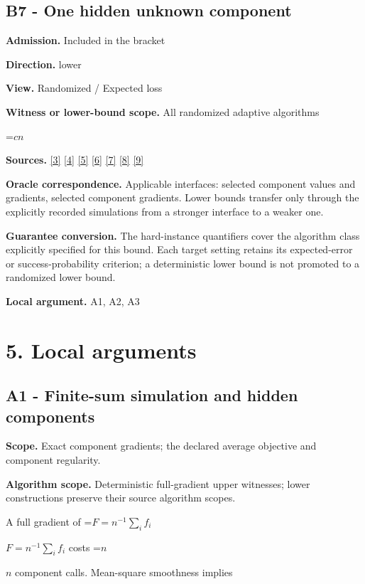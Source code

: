 \documentclass[10pt,a4paper]{article}
\newcommand{\AtlasMath}[1]{\par\begingroup\centering\setbox0=\hbox{$\displaystyle #1$}\ifdim\wd0>1.4\linewidth\typeout{ATLAS WIDE FORMULA: \the\wd0}\fi\ifdim\wd0>\linewidth\resizebox{\linewidth}{!}{\box0}\else\box0\fi\par\endgroup}
\newcommand{\AtlasInlineMath}[1]{\begingroup\setbox0=\hbox{$#1$}\ifdim\wd0>.4\linewidth\endgroup\AtlasMath{#1}\else\endgroup$#1$\fi}
\begin{document}
\subsection{B7 - One hidden unknown component}
\textbf{Admission.} Included in the bracket

\textbf{Direction.} lower

\textbf{View.} Randomized / Expected loss

\textbf{Witness or lower-bound scope.} All randomized adaptive algorithms

\AtlasMath{cn}
\textbf{Sources.} \href{https://proceedings.mlr.press/v97/zhou19b/zhou19b.pdf}{[3]} \href{https://arxiv.org/pdf/1405.4980}{[4]} \href{https://arxiv.org/pdf/2101.09740v2}{[5]} \href{https://arxiv.org/pdf/2609.33360v2}{[6]} \href{https://arxiv.org/pdf/2609.10874}{[7]} \href{https://www2.isye.gatech.edu/~nemirovs/MOR_AccuracyCertificates.pdf}{[8]} \href{https://arxiv.org/pdf/2609.20701}{[9]}

\textbf{Oracle correspondence.} Applicable interfaces: selected component values and gradients, selected component gradients. Lower bounds transfer only through the explicitly recorded simulations from a stronger interface to a weaker one.

\textbf{Guarantee conversion.} The hard-instance quantifiers cover the algorithm class explicitly specified for this bound. Each target setting retains its expected-error or success-probability criterion; a deterministic lower bound is not promoted to a randomized lower bound.

\textbf{Local argument.} A1, A2, A3

\section{5. Local arguments}
\subsection{A1 - Finite-sum simulation and hidden components}
\textbf{Scope.} Exact component gradients; the declared average objective and component regularity.

\textbf{Algorithm scope.} Deterministic full-gradient upper witnesses; lower constructions preserve their source algorithm scopes.

A full gradient of \AtlasInlineMath{F=n^{-1}\sum_i f_i} costs \AtlasInlineMath{n} component calls. Mean-square smoothness implies
\end{document}
